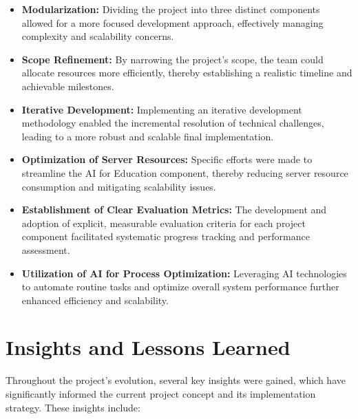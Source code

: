 \begin{itemize}
    \item \textbf{Modularization:} Dividing the project into three distinct components allowed for a more focused development approach, effectively managing complexity and scalability concerns.
    \item \textbf{Scope Refinement:} By narrowing the project’s scope, the team could allocate resources more efficiently, thereby establishing a realistic timeline and achievable milestones.
    \item \textbf{Iterative Development:} Implementing an iterative development methodology enabled the incremental resolution of technical challenges, leading to a more robust and scalable final implementation.
    \item \textbf{Optimization of Server Resources:} Specific efforts were made to streamline the AI for Education component, thereby reducing server resource consumption and mitigating scalability issues.
    \item \textbf{Establishment of Clear Evaluation Metrics:} The development and adoption of explicit, measurable evaluation criteria for each project component facilitated systematic progress tracking and performance assessment.
    \item \textbf{Utilization of AI for Process Optimization:} Leveraging AI technologies to automate routine tasks and optimize overall system performance further enhanced efficiency and scalability.
\end{itemize}

\section{Insights and Lessons Learned}

Throughout the project’s evolution, several key insights were gained, which have significantly informed the current project concept and its implementation strategy. These insights include:

